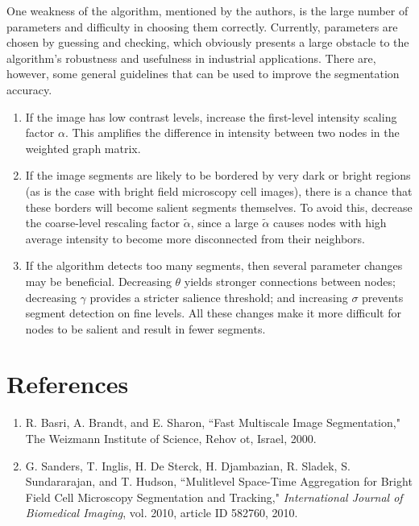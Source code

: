 \documentclass[12pt]{article}%
\begin{document}
One weakness of the algorithm, mentioned by the authors, is the large number of parameters and difficulty in choosing them correctly. Currently, parameters are chosen by guessing and checking, which obviously presents a large obstacle to the algorithm's robustness and usefulness in industrial applications. There are, however, some general guidelines that can be used to improve the segmentation accuracy.\\

\begin{enumerate}

\item If the image has low contrast levels, increase the first-level intensity scaling factor $\alpha$. This amplifies the difference in intensity between two nodes in the weighted graph matrix.

\item If the image segments are likely to be bordered by very dark or bright regions (as is the case with bright field microscopy cell images), there is a chance that these borders will become salient segments themselves. To avoid this, decrease the coarse-level rescaling factor $\tilde{\alpha}$, since a large $\tilde{\alpha}$ causes nodes with high average intensity to become more disconnected from their neighbors.

\item If the algorithm detects too many segments, then several parameter changes may be beneficial. Decreasing $\theta$ yields stronger connections between nodes; decreasing $\gamma$ provides a stricter salience threshold; and increasing $\sigma$ prevents segment detection on fine levels. All these changes make it more difficult for nodes to be salient and result in fewer segments.

\end{enumerate}


\section{References}
\begin{enumerate}
\item R. Basri, A. Brandt, and E. Sharon, ``Fast Multiscale Image Segmentation," The Weizmann Institute of Science, Rehov ot, Israel, 2000.
\item G. Sanders, T. Inglis, H. De Sterck, H. Djambazian, R. Sladek, S. Sundararajan, and T. Hudson, ``Mulitlevel Space-Time Aggregation for Bright Field Cell Microscopy Segmentation and Tracking," \textit{International Journal of Biomedical Imaging}, vol. 2010, article ID 582760, 2010.
\end{enumerate}
\end{document}
